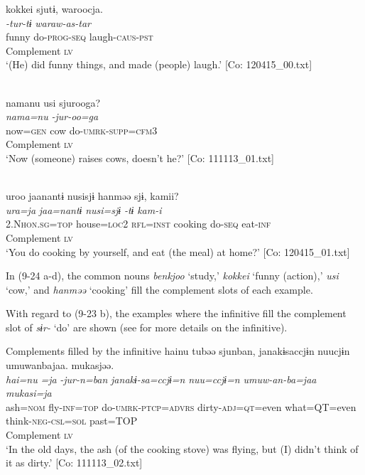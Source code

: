 \ex %
\gllll   {\textbar}kokkei{\textbar}  sjutɨ,  waroocja.\\
      \textit{}  \textit{-tur-tɨ}  \textit{waraw-as-tar}\\
      funny  do-\textsc{prog}-\textsc{seq}  laugh-\textsc{caus}-\textsc{pst}\\
      Complement  \textsc{lv}  \\
      \glt       ‘(He) did funny things, and made (people) laugh.’ [Co: 120415\_00.txt]

\ex\relax  [= (8-61 a)]\\
    \gllll  namanu  usi  sjurooga?\\
      \textit{nama=nu}  \textit{}  \textit{-jur-oo=ga}\\
      now=\textsc{gen}  cow  do-\textsc{umrk}-\textsc{supp}=\textsc{cfm}3\\
        Complement  \textsc{lv}\\
      \glt       ‘Now (someone) raises cows, doesn’t he?’ [Co: 111113\_01.txt]

\ex\relax [= (6-65 b)]\\
    \gllll  uroo  jaanantɨ  nusisjɨ  hanməə  sjɨ,  kamii?\\
      \textit{ura=ja}  \textit{jaa=nantɨ}  \textit{nusi=sjɨ}  \textit{}  \textit{-tɨ}  \textit{kam-i}\\
      2.N\textsc{hon}.\textsc{sg}=\textsc{top}  house=\textsc{loc}2  \textsc{rfl}=\textsc{inst}  cooking  do-\textsc{seq}  eat-\textsc{inf}\\
            Complement  \textsc{lv}  \\
      \glt       ‘You do cooking by yourself, and eat (the meal) at home?’ [Co: 120415\_01.txt]
    \z
\z

In (9-24 a-d), the common nouns \textit{benkjoo} ‘study,’ \textit{kokkei} ‘funny (action),’ \textit{usi} ‘cow,’ and \textit{hanməə} ‘cooking’ fill the complement slots of each example.

With regard to (9-23 b), the examples where the infinitive fill the complement slot of \textit{sɨr-} ‘do’ are shown (see  for more details on the infinitive).

\ea   Complements filled by the infinitive \label{ex:9.25}
\ea \label{ex:9.25a}%
 \gllll  hainu  tubəə  sjunban,  janakɨsaccjɨn  nuucjɨn  umuwanbajaa.  mukasjəə.\\
      \textit{hai=nu}  \textit{=ja}  \textit{-jur-n=ban}  \textit{janakɨ-sa=ccjɨ=n}    \textit{nuu=ccjɨ=n}  \textit{umuw-an-ba=jaa}  \textit{mukasi=ja}\\
      ash=\textsc{nom}  fly-\textsc{inf}=\textsc{top}  do-\textsc{umrk}-\textsc{ptcp}=\textsc{advrs}  dirty-\textsc{adj}=\textsc{qt}=even  what=QT=even  think-\textsc{neg}-\textsc{csl}=\textsc{sol}  past=TOP\\
       {} Complement  \textsc{lv}      \\
    \glt       ‘In the old days, the ash (of the cooking stove) was flying, but (I) didn’t think of it as dirty.’ [Co: 111113\_02.txt]

